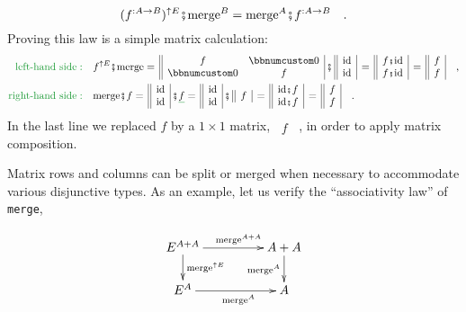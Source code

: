 ~\vspace{-0.3\baselineskip}
\[
(f^{:A\rightarrow B})^{\uparrow E}\bef\text{merge}^{B}=\text{merge}^{A}\bef f^{:A\rightarrow B}\quad.
\]
Proving this law is a simple matrix calculation:
\begin{align*}
{\color{greenunder}\text{left-hand side}:}\quad & f^{\uparrow E}\bef\text{merge}=\,\begin{array}{||cc|}
f & \bbnum 0\\
\bbnum 0 & f
\end{array}\,\bef\,\begin{array}{||c|}
\text{id}\\
\text{id}
\end{array}\,=\,\begin{array}{||c|}
f\bef\text{id}\\
f\bef\text{id}
\end{array}\,=\,\begin{array}{||c|}
f\\
f
\end{array}\quad,\\
{\color{greenunder}\text{right-hand side}:}\quad & \text{merge}\bef f=\,\begin{array}{||c|}
\text{id}\\
\text{id}
\end{array}\,\bef\gunderline f=\,\begin{array}{||c|}
\text{id}\\
\text{id}
\end{array}\,\bef\,\begin{array}{||c|}
f\end{array}\,=\,\begin{array}{||c|}
\text{id}\bef f\\
\text{id}\bef f
\end{array}\,=\,\begin{array}{||c|}
f\\
f
\end{array}\quad.
\end{align*}
In the last line we replaced $f$ by a $1\times1$ matrix, $\,\begin{array}{||c|}
f\end{array}$~, in order to apply matrix composition.

Matrix rows and columns can be split or merged when necessary to accommodate
various disjunctive types. As an example, let us verify the \textsf{``}associativity
law\textsf{''} of \lstinline!merge!,

\begin{wrapfigure}{L}{0.3\columnwidth}%
\vspace{-2\baselineskip}
\[
\xymatrix{\xyScaleY{1.6pc}\xyScaleX{4.0pc}E^{A+A}\ar[d]\sp(0.45){\text{merge}^{\uparrow E}}\ar[r]\sp(0.55){\text{merge}^{A+A}} & A+A\ar[d]\sb(0.5){\text{merge}^{A}}\\
E^{A}\ar[r]\sb(0.55){\text{merge}^{A}} & A
}
\]
\vspace{-0.1\baselineskip}
\end{wrapfigure}%

